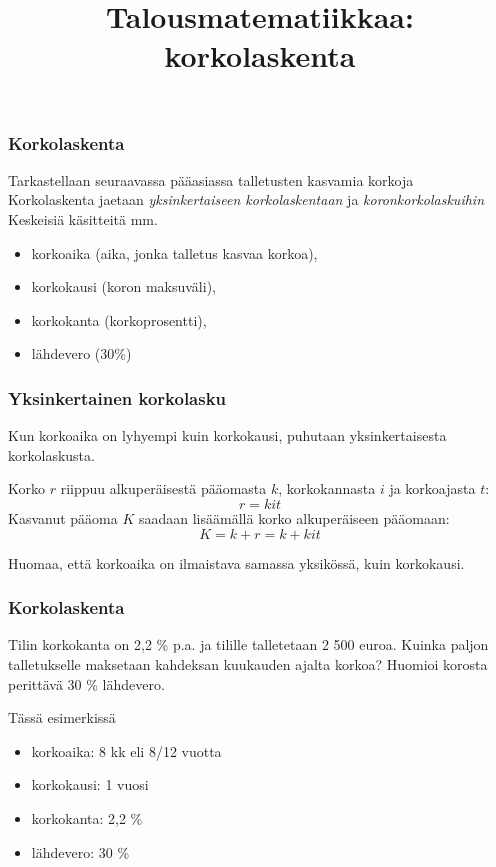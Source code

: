 \documentclass[]{beamer}
\title{Talousmatematiikkaa: korkolaskenta}
\newcommand{\pblock}{\\ \vspace{0.5cm}\pause}
\begin{document}
\begin{frame}
\maketitle
\end{frame}
\begin{frame}
    \frametitle{Korkolaskenta}
    Tarkastellaan seuraavassa pääasiassa talletusten kasvamia korkoja
    \pblock
    Korkolaskenta jaetaan \emph{yksinkertaiseen korkolaskentaan} ja \emph{koronkorkolaskuihin}
    \pblock
    Keskeisiä käsitteitä mm.
    \begin{itemize}
        \item korkoaika (aika, jonka talletus kasvaa korkoa),
        \item korkokausi (koron maksuväli),
        \item korkokanta (korkoprosentti),
        \item lähdevero (30\%)
    \end{itemize}
\end{frame}

\begin{frame}
    \frametitle{Yksinkertainen korkolasku}
    Kun korkoaika on lyhyempi kuin korkokausi, puhutaan yksinkertaisesta korkolaskusta.
    \pause
    \begin{block}{}
        Korko \(r\) riippuu alkuperäisestä pääomasta \(k\), korkokannasta \(i\) ja korkoajasta \(t\):\pause
        \[
        r = kit
        \]\pause
        Kasvanut pääoma \(K\) saadaan lisäämällä korko alkuperäiseen pääomaan:\pause
        \[
        K = k + r = k + kit
        \]
    \end{block}
    Huomaa, että korkoaika on ilmaistava samassa yksikössä, kuin korkokausi.
\end{frame}

\begin{frame}
    \frametitle{Korkolaskenta}
    \begin{esim}
        Tilin korkokanta on 2,2 \% p.a. ja tilille talletetaan 2 500 euroa.
        Kuinka paljon talletukselle maksetaan kahdeksan kuukauden ajalta korkoa? Huomioi korosta perittävä 30 \% lähdevero.
    \end{esim}
    \pause
    Tässä esimerkissä
    \begin{itemize}
        \item korkoaika: 8 kk eli 8/12 vuotta
        \item korkokausi: 1 vuosi
        \item korkokanta: 2,2 \%
        \item lähdevero: 30 \%
    \end{itemize}
\end{frame}
\end{document}

